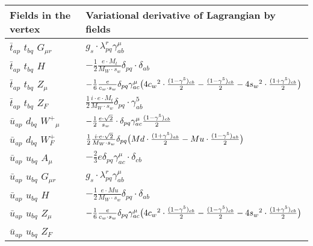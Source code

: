 \begin{center}
\begin{tabular}{|l|l|} \hline
Fields in the vertex & Variational derivative of Lagrangian by fields \\ \hline
$\bar{t}{}_{a p }$ \phantom{-} $t{}_{b q }$ \phantom{-} ${G}_{\mu r }$ \phantom{-}  &
	$ g_s\cdot \lambda_{p q}^r \gamma_{a b}^\mu $\\[2mm]
$\bar{t}{}_{a p }$ \phantom{-} $t{}_{b q }$ \phantom{-} ${H}_{}$ \phantom{-}  &
	$-\frac{1}{2}\frac{ e \cdot M_t}{ M_W \cdot s_w}\delta_{p q} \cdot \delta_{a b} $\\[2mm]
$\bar{t}{}_{a p }$ \phantom{-} $t{}_{b q }$ \phantom{-} ${Z}_{\mu }$ \phantom{-}  &
	$-\frac{1}{6}\frac{ e}{ c_w \cdot s_w}\delta_{p q} \gamma_{a c}^\mu \big(4 c_w{}^2 \cdot {(1-\gamma^5)_{c b}\over 2} -{(1-\gamma^5)_{c b}\over 2} -4 s_w{}^2 \cdot {(1+\gamma^5)_{c b}\over 2} \big)$\\[2mm]
$\bar{t}{}_{a p }$ \phantom{-} $t{}_{b q }$ \phantom{-} $Z_F{}_{}$ \phantom{-}  &
	$\frac{1}{2}\frac{ i \cdot e \cdot M_t}{ M_W \cdot s_w}\delta_{p q} \cdot \gamma_{a b}^5 $\\[2mm]
$\bar{u}{}_{a p }$ \phantom{-} $d{}_{b q }$ \phantom{-} $W^+{}_{\mu }$ \phantom{-}  &
	$-\frac{1}{2}\frac{ e \cdot\sqrt{2}}{ s_w}\cdot \delta_{p q} \gamma_{a c}^\mu {(1-\gamma^5)_{c b}\over 2} $\\[2mm]
$\bar{u}{}_{a p }$ \phantom{-} $d{}_{b q }$ \phantom{-} $W^+_F{}_{}$ \phantom{-}  &
	$\frac{1}{2}\frac{ i \cdot e \cdot\sqrt{2}}{ M_W \cdot s_w}\delta_{p q} \big( Md\cdot {(1+\gamma^5)_{a b}\over 2} - Mu\cdot {(1-\gamma^5)_{a b}\over 2} \big)$\\[2mm]
$\bar{u}{}_{a p }$ \phantom{-} $u{}_{b q }$ \phantom{-} ${A}_{\mu }$ \phantom{-}  &
	$-\frac{2}{3} e\delta_{p q} \gamma_{a c}^\mu \cdot \delta_{c b} $\\[2mm]
$\bar{u}{}_{a p }$ \phantom{-} $u{}_{b q }$ \phantom{-} ${G}_{\mu r }$ \phantom{-}  &
	$ g_s\cdot \lambda_{p q}^r \gamma_{a b}^\mu $\\[2mm]
$\bar{u}{}_{a p }$ \phantom{-} $u{}_{b q }$ \phantom{-} ${H}_{}$ \phantom{-}  &
	$-\frac{1}{2}\frac{ e \cdot Mu}{ M_W \cdot s_w}\delta_{p q} \cdot \delta_{a b} $\\[2mm]
$\bar{u}{}_{a p }$ \phantom{-} $u{}_{b q }$ \phantom{-} ${Z}_{\mu }$ \phantom{-}  &
	$-\frac{1}{6}\frac{ e}{ c_w \cdot s_w}\delta_{p q} \gamma_{a c}^\mu \big(4 c_w{}^2 \cdot {(1-\gamma^5)_{c b}\over 2} -{(1-\gamma^5)_{c b}\over 2} -4 s_w{}^2 \cdot {(1+\gamma^5)_{c b}\over 2} \big)$\\[2mm]
$\bar{u}{}_{a p }$ \phantom{-} $u{}_{b q }$ \phantom{-} $Z_F{}_{}$ \phantom{-}  &

\end{tabular}
\end{center}
